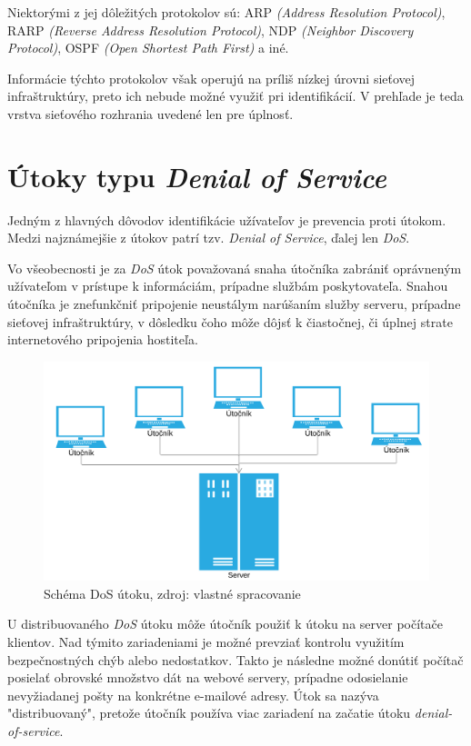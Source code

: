 \documentclass[
  printed, %
  table,   %
  lof,     %
  lot,     %
]{fithesis3}
\begin{document}
Niektorými z jej dôležitých protokolov sú: ARP
\textit{(Address Resolution Protocol)}, RARP
\textit{(Reverse Address Resolution Protocol)},
NDP \textit{(Neighbor Discovery Protocol)}, OSPF
\textit{(Open Shortest Path First)} a iné.

Informácie týchto protokolov však operujú na príliš nízkej úrovni sieťovej
infraštruktúry, preto ich nebude možné využiť pri identifikácií. V prehľade je 
teda vrstva sieťového rozhrania uvedené len pre úplnosť.

\chapter{Útoky typu \textit{Denial of Service}}
\label{ch:dos}
Jedným z hlavných dôvodov identifikácie užívateľov je prevencia proti útokom. Medzi
najznámejšie z útokov patrí tzv. \textit{Denial of Service}, ďalej len \textit{DoS}.

Vo všeobecnosti je za \textit{DoS} útok považovaná snaha útočníka zabrániť oprávneným
užívateľom v prístupe k informáciám, prípadne službám poskytovateľa. Snahou útočníka
je znefunkčniť pripojenie neustálym narúšaním služby serveru, prípadne sieťovej
infraštruktúry, v dôsledku čoho môže dôjsť k čiastočnej, či úplnej strate
internetového pripojenia hostiteľa. 

\begin{figure}[h]
  \centering
    \includegraphics[width=\textwidth]{images/dos.png}
  \caption{Schéma DoS útoku, zdroj: vlastné spracovanie}
  \label{fig:cs-basic}
\end{figure}

U distribuovaného \textit{DoS} útoku môže útočník použiť k útoku na server
počítače klientov. Nad týmito zariadeniami je možné prevziať kontrolu využitím
bezpečnostných chýb alebo nedostatkov. Takto je následne možné donútiť počítač
posielať obrovské množstvo dát na webové servery, prípadne odosielanie nevyžiadanej
pošty na konkrétne e-mailové adresy. Útok sa nazýva "distribuovaný", pretože útočník
používa viac zariadení na začatie útoku \textit{denial-of-service}.
\end{document}
